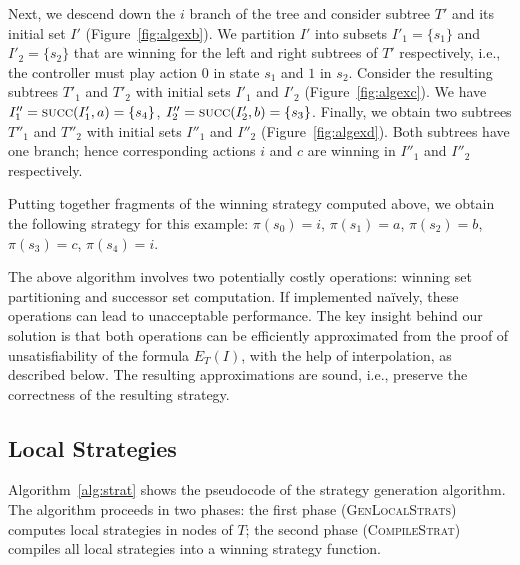 
Next, we descend down the $i$ branch of the tree and consider subtree $T'$ and its initial set $I'$ (Figure~\ref{fig:algexb}).  We partition $I'$ into subsets $I'_1=\{s_1\}$ and $I'_2=\{s_2\}$ that are winning for the left and right subtrees of $T'$ respectively, i.e., the controller must play action $0$ in state $s_1$ and $1$ in $s_2$.  Consider the resulting subtrees $T'_1$ and $T'_2$ with initial sets $I'_1$ and $I'_2$ (Figure~\ref{fig:algexc}).  We have $I''_1 = \textsc{succ}(I'_1, a) = \{s_4\}$, $I''_2 = \textsc{succ}(I'_2, b) = \{s_3\}$.  Finally, we obtain two subtrees $T''_1$ and $T''_2$ with initial sets $I''_1$ and $I''_2$ (Figure~\ref{fig:algexd}).  Both subtrees have one branch; hence corresponding actions $i$ and $c$ are winning in $I''_1$ and $I''_2$ respectively.

Putting together fragments of the winning strategy computed above, we obtain the following strategy for this example: $\pi(s_0)=i$, $\pi(s_1)=a$, $\pi(s_2)=b$, $\pi(s_3)=c$, $\pi(s_4)=i$.

The above algorithm involves two potentially costly operations: winning set partitioning and successor set computation.  If implemented na\"ively, these operations can lead to unacceptable performance.  The key insight behind our solution is that both operations can be efficiently approximated from the proof of unsatisfiability of the formula $E_T(I)$, with the help of interpolation, as described below.  The resulting approximations are sound, i.e., preserve the correctness of the resulting strategy.

\subsection{Local Strategies}

Algorithm~\ref{alg:strat} shows the pseudocode of the strategy generation algorithm.  The algorithm proceeds in two phases: the first phase (\textsc{GenLocalStrats}) computes local strategies in nodes of $T$; the second phase (\textsc{CompileStrat}) compiles all local strategies into a winning strategy function.

